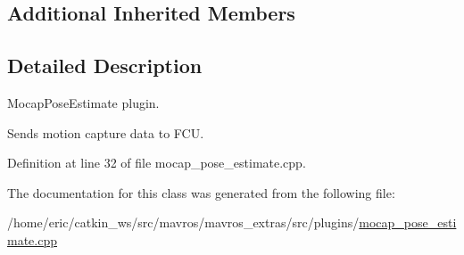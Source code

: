 \subsection*{Additional Inherited Members}


\subsection{Detailed Description}
Mocap\+Pose\+Estimate plugin. 

Sends motion capture data to F\+CU. 

Definition at line 32 of file mocap\+\_\+pose\+\_\+estimate.\+cpp.



The documentation for this class was generated from the following file\+:\begin{DoxyCompactItemize}
\item 
/home/eric/catkin\+\_\+ws/src/mavros/mavros\+\_\+extras/src/plugins/\mbox{\hyperlink{mocap__pose__estimate_8cpp}{mocap\+\_\+pose\+\_\+estimate.\+cpp}}\end{DoxyCompactItemize}

